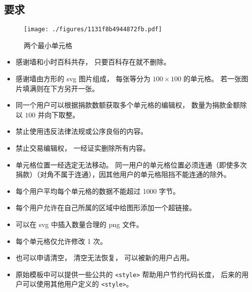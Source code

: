 
\subsection{要求}

\begin{figure}[ht]
\centering
\texttt{[image: ./figures/1131f8b4944872fb.pdf]}
\caption{两个最小单元格} \label{fig_thanks_1}
\end{figure}

\begin{itemize}
\item 感谢墙和小时百科共存， 只要百科存在就不删除。
\item 感谢墙由方形的 svg 图片组成， 每张等分为 $100\times 100$ 的单元格。 若一张图片填满则在下方另开一张。
\item 同一个用户可以根据捐款数额获取多个单元格的编辑权， 数量为捐款金额除以 $100$ 并向下取整。
\item 禁止使用违反法律法规或公序良俗的内容。
\item 禁止交易编辑权， 一经证实删除所有内容。
\item 单元格位置一经选定无法移动。 同一用户的单元格位置必须连通（即使多次捐款）（对角不属于连通），因其他用户的单元格阻挡不能连通的除外。
\item 每个用户平均每个单元格的数据不能超过 1000 字节。
\item 每个用户允许在自己所属的区域中给图形添加一个超链接。
\item 可以在 svg 中插入数量合理的 png 文件。
\item 每个单元格仅允许修改 1 次。
\item 也可以申请清空， 清空无法恢复， 可以被新的用户占用。
\item 原始模板中可以提供一些公共的 \verb`<style>` 帮助用户节约代码长度， 后来的用户可以使用其他用户定义的 \verb`<style>`。
\end{itemize}

